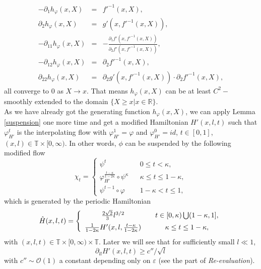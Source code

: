 \documentclass{amsart}
\begin{document}
\begin{eqnarray*}
-\partial_1h_\varphi(x,X)&=&f'^{-1}(x,X),\\
\partial_2h_\varphi(x,X)&=&g'(x,f'^{-1}(x,X)),\\
-\partial_{11}h_\varphi(x,X)&=&-\frac{\partial_1f'(x,f'^{-1}(x,X))}{\partial_2 f'(x,f'^{-1}(x,X))},\\
-\partial_{12}h_\varphi(x,X)&=&\partial_2f'^{-1}(x,X),\\
\partial_{22}h_\varphi(x,X)&=&\partial_2g'(x,f'^{-1}(x,X))\cdot\partial_2f'^{-1}(x,X),
\end{eqnarray*}
all converge to $0$ as $X\rightarrow x$. That means $h_{\varphi}(x,X)$ can be at least $C^2-$smoothly extended to the domain $\{X\geq x|x\in{\mathbb{R}}\}$.\\

As we have already got the generating function $h_{\varphi}(x,X)$, we can apply Lemma \ref{suspension} one more time and get a modified Hamiltonian $H'(x,l,t)$ such that $\varphi_{H'}^t$ is the interpolating flow
with $\varphi_{H'}^1=\varphi$ and $\varphi_{H'}^0=id$, $t\in[0,1]$, $(x,l)\in{\mathbb{T}}\times[0,\infty)$. In other words, $\phi$ can be suspended by the following modified flow
\begin{equation}
\chi_t=\left\{
\begin{array}{cccccc}
\psi^t & & 0\leq t<\kappa,\\
\varphi_{H'}^{\frac{t-\kappa}{1-2\kappa}}\circ\psi^\kappa & & \kappa\leq t\leq1-\kappa,\\
\psi^{t-1}\circ\varphi & & 1-\kappa<t\leq 1,
\end{array}\right.
\end{equation}
which is generated by the periodic Hamiltonian 
\begin{equation}\label{piecewise}
\hat{H}(x,l,t)=\left\{
\begin{array}{cccccc}
\frac{2\sqrt{2}}{3}l^{3/2} & & t\in[0,\kappa)\bigcup(1-\kappa,1],\vspace{5pt}\\
\frac{1}{1-2\kappa}H'(x,l,\frac{t-\kappa}{1-2\kappa})& & \kappa\leq t\leq 1-\kappa,
\end{array}\right.
\end{equation}
with $(x,l,t)\in{\mathbb{T}}\times[0,\infty)\times{\mathbb{T}}$.  Later we will see that for sufficiently small $l\ll1$, 
\[
\partial_{ll}H'(x,l,t)\geq c''/\sqrt{l}
\] 
with $c''\sim{\mathcal{O}}(1)$ a constant depending only on ${\varepsilon}$ (see the part of {\it Re-evaluation}). 
\end{document}
